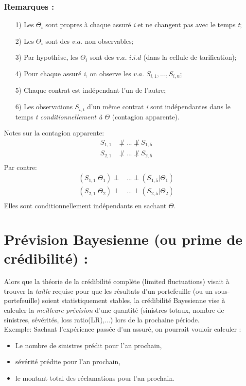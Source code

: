\documentclass[11pt,french]{report}
\begin{document}
\subsubsection*{Remarques :}
\begin{itemize}
\item[1)] Les $\Theta_i$ sont propres à chaque assuré \emph{i} et ne changent pas avec le temps \emph{t};
\item[2)] Les $\Theta_i$ sont des $v.a.$ non observables;
\item[3)] Par hypothèse, les $\Theta_i$ sont des $v.a.$ $i.i.d$ (dans la cellule de tarification);
\item[4)] Pour chaque assuré \emph{i}, on observe les $v.a.$ $S_{i,1}, ..., S_{i,n}$;
\item[5)] Chaque contrat est indépendant l'un de l'autre;
\item[6)] Les observations $S_{i,t}$ d'un même contrat \emph{i} sont indépendantes dans le temps \emph{t} \emph{conditionnellement à $\Theta$} (contagion apparente).
\end{itemize}
Notes sur la contagion apparente:
\begin{align*}
S_{1,1} & \not\perp ... \not\perp S_{1,5} \\
S_{2,1} & \not\perp ... \not\perp S_{2,5} \\
\end{align*}
Par contre:
\begin{align*}
(S_{1,1}|\Theta_1) \perp & ... \perp (S_{1,5}|\Theta_1) \\
(S_{2,1}|\Theta_2) \perp & ... \perp (S_{2,5}|\Theta_2) \\
\end{align*}
Elles sont conditionnellement indépendants en sachant $\Theta$.

\section{Prévision Bayesienne (ou prime de crédibilité) :}
Alors  que la théorie de la crédibilité complète (limited fluctuations) visait à trouver la \emph{taille} requise pour que les résultats d'un portefeuille (ou un sous-portefeuille) soient statistiquement stables, la crédibilité Bayesienne vise à calculer la \emph{meilleure prévision} d'une quantité (sinistres totaux, nombre de sinistres, sévérités, loss ratio(LR),...) lors de la prochaine période.
\\

Exemple:
Sachant l'expérience passée d'un assuré, on pourrait vouloir calculer :
\begin{itemize}
\item Le nombre de sinistres prédit pour l'an prochain,
\item sévérité prédite pour  l'an prochain,
\item le montant total des réclamations pour l'an prochain.
\end{itemize}
\end{document}
